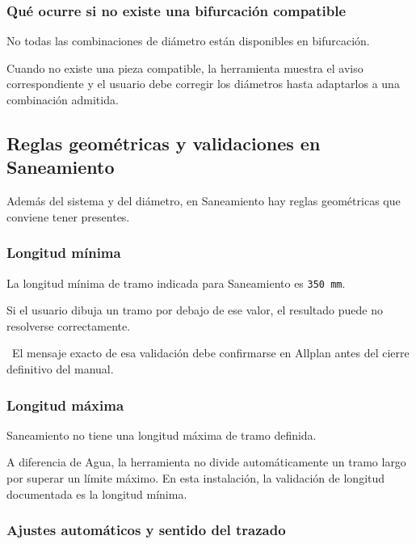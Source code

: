 
\subsubsection{Qué ocurre si no existe una bifurcación compatible}

No todas las combinaciones de diámetro están disponibles en bifurcación.

Cuando no existe una pieza compatible, la herramienta muestra el aviso correspondiente y el usuario debe corregir los diámetros hasta adaptarlos a una combinación admitida.

\subsection{Reglas geométricas y validaciones en Saneamiento}

Además del sistema y del diámetro, en Saneamiento hay reglas geométricas que conviene tener presentes.

\subsubsection{Longitud mínima}

La longitud mínima de tramo indicada para Saneamiento es \texttt{350 mm}.

Si el usuario dibuja un tramo por debajo de ese valor, el resultado puede no resolverse correctamente.

\pendingtag\ El mensaje exacto de esa validación debe confirmarse en Allplan antes del cierre definitivo del manual.

\subsubsection{Longitud máxima}

Saneamiento no tiene una longitud máxima de tramo definida.

A diferencia de Agua, la herramienta no divide automáticamente un tramo largo por superar un límite máximo. En esta instalación, la validación de longitud documentada es la longitud mínima.

\subsubsection{Ajustes automáticos y sentido del trazado}

